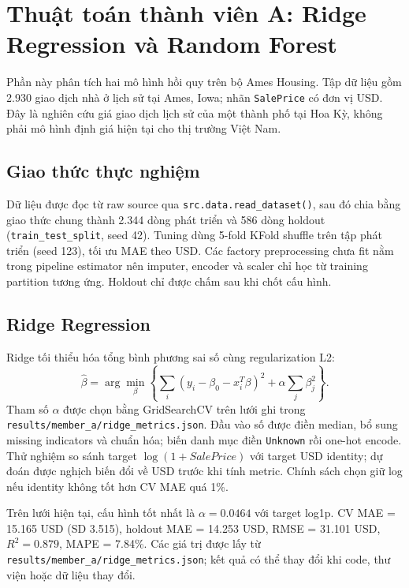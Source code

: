 \section{Thuật toán thành viên A: Ridge Regression và Random Forest}
\label{sec:member-a}

Phần này phân tích hai mô hình hồi quy trên bộ Ames Housing. Tập dữ liệu gồm
2.930 giao dịch nhà ở lịch sử tại Ames, Iowa; nhãn \texttt{SalePrice} có đơn vị
USD. Đây là nghiên cứu giá giao dịch lịch sử của một thành phố tại Hoa Kỳ, không
phải mô hình định giá hiện tại cho thị trường Việt Nam.

\subsection{Giao thức thực nghiệm}

Dữ liệu được đọc từ raw source qua \texttt{src.data.read\_dataset()}, sau đó
chia bằng giao thức chung thành 2.344 dòng phát triển và 586 dòng holdout
(\texttt{train\_test\_split}, seed 42). Tuning dùng 5-fold KFold shuffle trên
tập phát triển (seed 123), tối ưu MAE theo USD. Các factory preprocessing chưa
fit nằm trong pipeline estimator nên imputer, encoder và scaler chỉ học từ
training partition tương ứng. Holdout chỉ được chấm sau khi chốt cấu hình.

\subsection{Ridge Regression}

Ridge tối thiểu hóa tổng bình phương sai số cùng regularization L2:
\[
  \hat{\beta}=\arg\min_{\beta}\left\{\sum_i(y_i-\beta_0-x_i^T\beta)^2+
  \alpha\sum_j\beta_j^2\right\}.
\]
Tham số \(\alpha\) được chọn bằng GridSearchCV trên lưới ghi trong
\texttt{results/member\_a/ridge\_metrics.json}. Đầu vào số được điền median,
bổ sung missing indicators và chuẩn hóa; biến danh mục điền \texttt{Unknown} rồi
one-hot encode. Thử nghiệm so sánh target \(\log(1+SalePrice)\) với target USD
identity; dự đoán được nghịch biến đổi về USD trước khi tính metric. Chính sách
chọn giữ log nếu identity không tốt hơn CV MAE quá 1\%.

Trên lưới hiện tại, cấu hình tốt nhất là \(\alpha=0.0464\) với target log1p.
CV MAE = 15.165 USD (SD 3.515), holdout MAE = 14.253 USD, RMSE = 31.101 USD,
\(R^2=0.879\), MAPE = 7.84\%. Các giá trị được lấy từ
\texttt{results/member\_a/ridge\_metrics.json}; kết quả có thể thay đổi khi code,
thư viện hoặc dữ liệu thay đổi.

